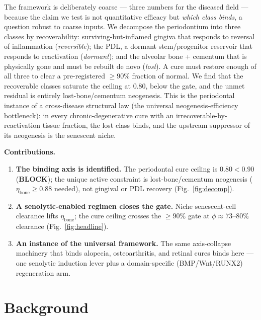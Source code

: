 \documentclass[11pt,a4paper]{article}
\begin{document}
The framework is deliberately coarse --- three numbers for the diseased field ---
because the claim we test is not quantitative efficacy but \emph{which class binds},
a question robust to coarse inputs. We decompose the periodontium into three classes
by recoverability: surviving-but-inflamed gingiva that responds to reversal of
inflammation (\emph{reversible}); the PDL, a dormant stem/progenitor reservoir
\citep{seo2004} that responds to reactivation (\emph{dormant}); and the alveolar
bone + cementum that is physically gone and must be rebuilt de novo (\emph{lost}).
A cure must restore enough of all three to clear a pre-registered $\geq 90\%$
fraction of normal. We find that the recoverable classes saturate the ceiling at
$0.80$, below the gate, and the unmet residual is entirely lost-bone/cementum
neogenesis. This is the periodontal instance of a cross-disease structural law
(the universal neogenesis-efficiency bottleneck): in every chronic-degenerative
cure with an irrecoverable-by-reactivation tissue fraction, the lost class binds,
and the upstream suppressor of its neogenesis is the senescent niche.

\medskip\noindent\textbf{Contributions.}
\begin{enumerate}\itemsep0.3em
\item \textbf{The binding axis is identified.} The periodontal cure ceiling is
$0.80<0.90$ (\textbf{BLOCK}); the unique active constraint is lost-bone/cementum
neogenesis ($\eta_{\text{bone}}\geq 0.88$ needed), not gingival or PDL recovery
(Fig.~\ref{fig:decomp}).
\item \textbf{A senolytic-enabled regimen closes the gate.} Niche senescent-cell
clearance lifts $\eta_{\text{bone}}$; the cure ceiling crosses the $\geq 90\%$ gate
at $\phi\approx 73$--$80\%$ clearance (Fig.~\ref{fig:headline}).
\item \textbf{An instance of the universal framework.} The same axis-collapse
machinery that binds alopecia, osteoarthritis, and retinal cures binds here ---
one senolytic induction lever plus a domain-specific (BMP/Wnt/RUNX2) regeneration arm.
\end{enumerate}

\section{Background}
\label{sec:bg}
\end{document}
